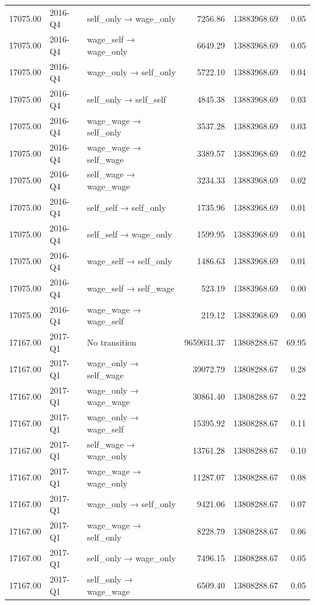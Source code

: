 \begin{table}[ht]
{\begin{tabular}{rllrrr}
  17075.00 & 2016-Q4 & self\_only → wage\_only & 7256.86 & 13883968.69 & 0.05 \\ 
  17075.00 & 2016-Q4 & wage\_self → wage\_only & 6649.29 & 13883968.69 & 0.05 \\ 
  17075.00 & 2016-Q4 & wage\_only → self\_only & 5722.10 & 13883968.69 & 0.04 \\ 
  17075.00 & 2016-Q4 & self\_only → self\_self & 4845.38 & 13883968.69 & 0.03 \\ 
  17075.00 & 2016-Q4 & wage\_wage → self\_only & 3537.28 & 13883968.69 & 0.03 \\ 
  17075.00 & 2016-Q4 & wage\_wage → self\_wage & 3389.57 & 13883968.69 & 0.02 \\ 
  17075.00 & 2016-Q4 & self\_wage → wage\_wage & 3234.33 & 13883968.69 & 0.02 \\ 
  17075.00 & 2016-Q4 & self\_self → self\_only & 1735.96 & 13883968.69 & 0.01 \\ 
  17075.00 & 2016-Q4 & self\_self → wage\_only & 1599.95 & 13883968.69 & 0.01 \\ 
  17075.00 & 2016-Q4 & wage\_self → self\_only & 1486.63 & 13883968.69 & 0.01 \\ 
  17075.00 & 2016-Q4 & wage\_self → self\_wage & 523.19 & 13883968.69 & 0.00 \\ 
  17075.00 & 2016-Q4 & wage\_wage → wage\_self & 219.12 & 13883968.69 & 0.00 \\ 
  17167.00 & 2017-Q1 & No transition & 9659031.37 & 13808288.67 & 69.95 \\ 
  17167.00 & 2017-Q1 & wage\_only → self\_wage & 39072.79 & 13808288.67 & 0.28 \\ 
  17167.00 & 2017-Q1 & wage\_only → wage\_wage & 30861.40 & 13808288.67 & 0.22 \\ 
  17167.00 & 2017-Q1 & wage\_only → wage\_self & 15395.92 & 13808288.67 & 0.11 \\ 
  17167.00 & 2017-Q1 & self\_wage → wage\_only & 13761.28 & 13808288.67 & 0.10 \\ 
  17167.00 & 2017-Q1 & wage\_wage → wage\_only & 11287.07 & 13808288.67 & 0.08 \\ 
  17167.00 & 2017-Q1 & wage\_only → self\_only & 9421.06 & 13808288.67 & 0.07 \\ 
  17167.00 & 2017-Q1 & wage\_wage → self\_only & 8228.79 & 13808288.67 & 0.06 \\ 
  17167.00 & 2017-Q1 & self\_only → wage\_only & 7496.15 & 13808288.67 & 0.05 \\ 
  17167.00 & 2017-Q1 & self\_only → wage\_wage & 6509.40 & 13808288.67 & 0.05 \\ 

\end{tabular}}
\end{table}
